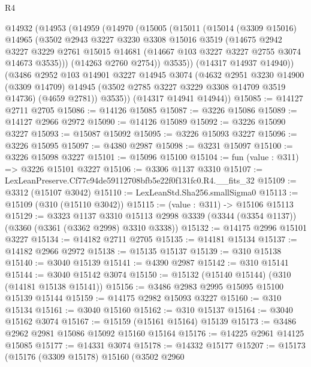 \begin{lexlean}{R4}
\begin{coremodule}
  @14932
    (@14953
      (@14959
        (@14970
          (@15005
            (@15011
              (@15014
                (@3309 @15016)
                @14965
                (@3502
                  @2943
                  @3227
                  @3230
                  @3308
                  @15016
                  @3519
                  (@14675
                    @2942
                    @3227
                    @3229
                    @2761
                    @15015
                    @14681
                    (@14667 @103 @3227 @3227 @2755 @3074 @14673 @3535)))
                (@14263 @2760 @2754))
              @3535))
          (@14317 @14937 @14940))
        (@3486
          @2952
          @103
          @14901
          @3227
          @14945
          @3074
          (@4632
            @2951
            @3230
            @14900
            (@3309 @14709)
            @14945
            (@3502 @2785 @3227 @3229 @3308 @14709 @3519 @14736)
            (@4659 @2781))
          @3535))
      (@14317 @14941 @14944))
@15085 := @14127 @2711 @2705
@15086 := @14126 @15085
@15087 := @3226 @15086
@15089 := @14127 @2966 @2972
@15090 := @14126 @15089
@15092 := @3226 @15090 @3227
@15093 := @15087 @15092
@15095 := @3226 @15093 @3227
@15096 := @3226 @15095
@15097 := @4380 @2987
@15098 := @3231 @15097
@15100 := @3226 @15098 @3227
@15101 := @15096 @15100
@15104 := fun (value : @311) => @3226 @15101 @3227
@15106 := @3306 @1137 @3310
@15107 := LexLeanPreserve.Cf77c94de59112708bfb5e22f0f131fc0.R4.__fits_32
@15109 := @3312 (@15107 @3042)
@15110 := LexLeanStd.Sha256.smallSigma0
@15113 := @15109 (@310 (@15110 @3042))
@15115 := (value : @311) -> @15106 @15113
@15129 := @3323
    @1137
    @3310
    @15113
    @2998
    @3339
    (@3344 (@3354 @1137))
    (@3360 (@3361 (@3362 @2998) @3310 @3338))
@15132 := @14175 @2996 @15101 @3227
@15134 := @14182 @2711 @2705
@15135 := @14181 @15134
@15137 := @14182 @2966 @2972
@15138 := @15135 @15137
@15139 := @310 @15138
@15140 := @3040 @15139
@15141 := @4390 @2987
@15142 := @310 @15141
@15144 := @3040 @15142 @3074
@15150 := @15132 (@15140 @15144) (@310 (@14181 @15138 @15141))
@15156 := @3486 @2983 @2995 @15095 @15100 @15139 @15144
@15159 := @14175 @2982 @15093 @3227
@15160 := @310 @15134
@15161 := @3040 @15160
@15162 := @310 @15137
@15164 := @3040 @15162 @3074
@15167 := @15159 (@15161 @15164) @15139
@15173 := @3486 @2962 @2981 @15086 @15092 @15160 @15164
@15176 := @14225 @2961 @14125 @15085
@15177 := @14331 @3074
@15178 := @14332 @15177
@15207 := @15173
    (@15176
      (@3309 @15178)
      @15160
      (@3502
        @2960

\end{coremodule}
\end{lexlean}

